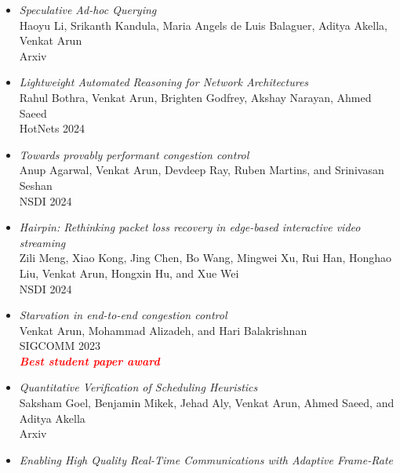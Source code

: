 \documentclass[notitlepage]{article}
\newcommand{\heading}[1]{\vspace{1em}{\large \MakeUppercase{\textrm{#1}}}

  \hrulefill
}
\newcommand{\highlight}[1]{\textcolor{red}{\textit{\textbf{#1}}}}
\begin{document}
\heading{Publications}

\begin{itemize}[noitemsep,nolistsep]
        \item {\it Speculative Ad-hoc Querying}\label{paper:speql}\\
      Haoyu Li, Srikanth Kandula, Maria Angels de Luis Balaguer, Aditya Akella, Venkat Arun\\
      Arxiv\\
              \item {\it Lightweight Automated Reasoning for Network Architectures}\label{paper:archie}\\
      Rahul Bothra, Venkat Arun, Brighten Godfrey, Akshay Narayan, Ahmed Saeed\\
      HotNets 2024\\
              \item {\it Towards provably performant congestion control}\label{paper:ccmatic}\\
      Anup Agarwal, Venkat Arun, Devdeep Ray, Ruben Martins, and Srinivasan Seshan\\
      NSDI 2024\\
              \item {\it Hairpin: Rethinking packet loss recovery in edge-based interactive video streaming}\label{paper:hairpin}\\
      Zili Meng, Xiao Kong, Jing Chen, Bo Wang, Mingwei Xu, Rui Han, Honghao Liu, Venkat Arun, Hongxin Hu, and Xue Wei\\
      NSDI 2024\\
              \item {\it Starvation in end-to-end congestion control}\label{paper:starvation}\\
      Venkat Arun, Mohammad Alizadeh, and Hari Balakrishnan\\
      SIGCOMM 2023\\
              \highlight{Best student paper award}\\
              \item {\it Quantitative Verification of Scheduling Heuristics}\label{paper:perf_verif}\\
      Saksham Goel, Benjamin Mikek, Jehad Aly, Venkat Arun, Ahmed Saeed, and Aditya Akella\\
      Arxiv\\
              \item {\it Enabling High Quality Real-Time Communications with Adaptive Frame-Rate}\label{paper:afr}\\

\end{itemize}
\end{document}
